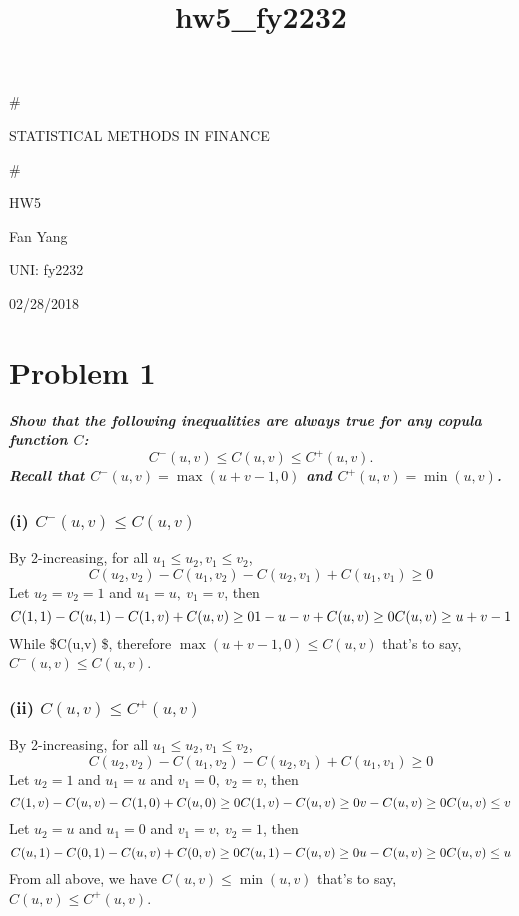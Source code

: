 \documentclass[11pt]{article}
\title{hw5\_fy2232}
\begin{document}
    
    
    \maketitle
    
    

    
     \#

STATISTICAL METHODS IN FINANCE

\#

HW5

Fan Yang

UNI: fy2232

02/28/2018

    \hypertarget{problem-1}{%
\section{Problem 1}\label{problem-1}}

    \textbf{\emph{Show that the following inequalities are always true for
any copula function \(C\): \[C^−(u, v) \leq C(u, v) \leq C^+(u, v).\]}}
\textbf{\emph{Recall that \(C^−(u, v) = \max(u + v − 1, 0)\) and
\(C^+(u, v) = \min(u, v)\).}}

    \hypertarget{i-cu-v-leq-cu-v}{%
\subsubsection{\texorpdfstring{(i)
\(C^−(u, v) \leq C(u, v)\)}{(i) C\^{}−(u, v) \textbackslash{}leq C(u, v)}}\label{i-cu-v-leq-cu-v}}

    By 2-increasing, for all \(u_1\leq u_2,v_1\leq v_2\),
\[C(u_2,v_2)-C(u_1,v_2)-C(u_2,v_1)+C(u_1,v_1)\geq 0\] Let \(u_2=v_2=1\)
and \(u_1= u, ~ v_1=v\), then \[C(1,1)-C(u,1)-C(1,v)+C(u,v)\geq 0\\
1-u-v+C(u,v)\geq 0\\
C(u,v)\geq u+v-1\] While \$C(u,v) \$, therefore
\(\max(u + v − 1, 0) \leq C(u, v)\) that's to say,
\(C^−(u, v) \leq C(u, v)\).

    \hypertarget{ii-cu-v-leq-cu-v}{%
\subsubsection{\texorpdfstring{(ii)
\(C(u, v) \leq C^+(u, v)\)}{(ii) C(u, v) \textbackslash{}leq C\^{}+(u, v)}}\label{ii-cu-v-leq-cu-v}}

    By 2-increasing, for all \(u_1\leq u_2,v_1\leq v_2\),
\[C(u_2,v_2)-C(u_1,v_2)-C(u_2,v_1)+C(u_1,v_1)\geq 0\] Let \(u_2=1\) and
\(u_1=u\) and \(v_1= 0, ~ v_2=v\), then
\[C(1,v)-C(u,v)-C(1,0)+C(u,0)\geq 0\\
C(1,v)-C(u,v)\geq 0\\
v-C(u,v)\geq 0\\
C(u,v)\leq v\] Let \(u_2=u\) and \(u_1=0\) and \(v_1= v, ~ v_2=1\), then
\[C(u,1)-C(0,1)-C(u,v)+C(0,v)\geq 0\\
C(u,1)-C(u,v)\geq 0\\
u-C(u,v)\geq 0\\
C(u,v)\leq u\] From all above, we have \(C(u, v) \leq\min(u, v)\) that's
to say, \(C(u, v)\leq C^+(u, v)\).
\end{document}
